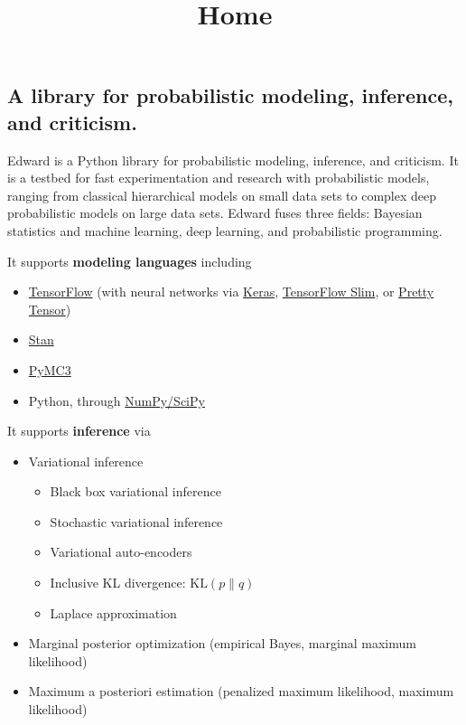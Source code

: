 \title{Home}

\subsection{A library for probabilistic modeling, inference, and criticism.}
Edward is a Python library for probabilistic modeling, inference, and
criticism. It is a testbed for fast experimentation and research with
probabilistic models, ranging from classical hierarchical models on
small data sets to complex deep probabilistic models on large data
sets. Edward fuses three fields: Bayesian statistics and machine
learning, deep learning, and probabilistic programming.


It supports \textbf{modeling languages} including
\begin{itemize}
\item \href{https://www.tensorflow.org}{TensorFlow} (with neural
  networks via \href{http://keras.io}{Keras},
  \href{https://github.com/tensorflow/tensorflow/tree/master/tensorflow/contrib/slim}{TensorFlow
  Slim}, or
  \href{https://github.com/google/prettytensor}{Pretty Tensor})
\item \href{http://mc-stan.org}{Stan}
\item \href{http://pymc-devs.github.io/pymc3/}{PyMC3}
\item Python, through \href{http://scipy.org/}{NumPy/SciPy}
\end{itemize}

It supports \textbf{inference} via
\begin{itemize}
\item Variational inference
\begin{itemize}
    \item Black box variational inference
    \item Stochastic variational inference
    \item Variational auto-encoders
    \item Inclusive KL divergence: $\text{KL}(p\|q)$
    \item Laplace approximation
  \end{itemize}
\item Marginal posterior optimization (empirical Bayes, marginal maximum
likelihood)
\item Maximum a posteriori estimation (penalized maximum likelihood, maximum
  likelihood)
\end{itemize}

